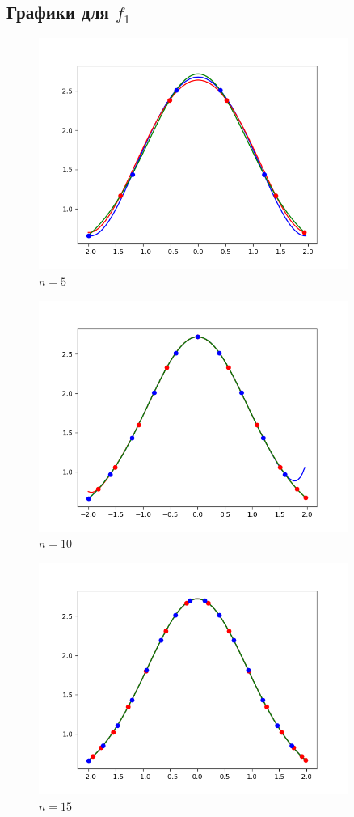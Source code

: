 \documentclass{article}
\begin{document}
\subsection*{Графики для $f_1$}
\begin{figure}[H]
\caption{$n=5$}
\centering
\includegraphics[width=0.9\textwidth]{f1_5}
\end{figure}
\begin{figure}[H]
\caption{$n=10$}
\centering
\includegraphics[width=0.9\textwidth]{f1_10.png}
\end{figure}
\begin{figure}[H]
\caption{$n=15$}
\centering
\includegraphics[width=0.9\textwidth]{f1_15}
\end{figure}
\end{document}
